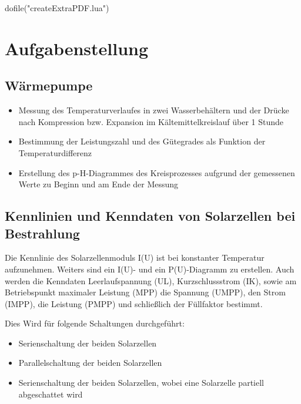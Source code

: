 \documentclass[12pt,english,ngerman]{scrartcl}
\begin{document}
\begin{luacode*}
	dofile("createExtraPDF.lua")
\end{luacode*}

% 
\tableofcontents

\newpage

\section{Aufgabenstellung\label{Auf}}

\subsection{Wärmepumpe}

\begin{itemize}
	\item Messung des Temperaturverlaufes in zwei Wasserbehältern und der Drücke nach Kompression bzw. Expansion im
	      Kältemittelkreislauf über 1 Stunde
	\item Bestimmung der Leistungszahl und des Gütegrades als Funktion der
	      Temperaturdifferenz
	\item Erstellung des p-H-Diagrammes des Kreisprozesses aufgrund der gemessenen Werte
	      zu Beginn und am Ende der Messung \cite{unterlagen_warmepumpe}
\end{itemize}
\subsection{Kennlinien und Kenndaten von Solarzellen bei Bestrahlung}

Die Kennlinie des Solarzellenmoduls I(U) ist bei konstanter Temperatur
aufzunehmen. Weiters sind ein I(U)- und ein P(U)-Diagramm zu erstellen. Auch
werden die Kenndaten Leerlaufspannung (UL), Kurzschlussstrom (IK), sowie am
Betriebspunkt maximaler Leistung (MPP) die Spannung (UMPP), den Strom (IMPP),
die Leistung (PMPP) und schließlich der Füllfaktor bestimmt.

Dies Wird für folgende Schaltungen durchgeführt:

\begin{itemize}
	\item Serienschaltung der beiden Solarzellen
	\item Parallelschaltung der beiden Solarzellen
	\item Serienschaltung der beiden Solarzellen, wobei eine Solarzelle partiell
	      abgeschattet wird
\end{itemize}
\end{document}

